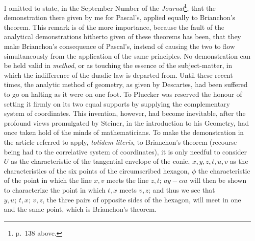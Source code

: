 \documentclass[11pt]{article}
\newcommand{\sourcepage}[1]{\marginpar{\scriptsize p.~#1}}
\begin{document}
\sourcepage{151}
I omitted to state, in the September Number of the \emph{Journal}\footnote{p.~138 above.}, that the demonstration there given by me for Pascal's, applied equally to Brianchon's theorem. This remark is of the more importance, because the fault of the analytical demonstrations hitherto given of these theorems has been, that they make Brianchon's consequence of Pascal's, instead of causing the two to flow simultaneously from the application of the same principles. No demonstration can be held valid in \emph{method}, or as touching the essence of the subject-matter, in which the indifference of the duadic law is departed from. Until these recent times, the analytic method of geometry, as given by Descartes, had been suffered to go on halting as it were on one foot. To Pluecker was reserved the honour of setting it firmly on its two equal supports by supplying the complementary system of coordinates. This invention, however, had become inevitable, after the profound views promulgated by Steiner, in the introduction to his Geometry, had once taken hold of the minds of mathematicians. To make the demonstration in the article referred to apply, \emph{totidem literis}, to Brianchon's theorem (recourse being had to the correlative system of coordinates), it is only needful to consider $U$ as the characteristic of the tangential envelope of the conic, $x,y,z,t,u,v$ as the characteristics of the six points of the circumscribed hexagon, $\phi$ the characteristic of the point in which the line $x,v$ meets the line $z,t$; $ay-\alpha u$ will then be shown to characterize the point in which $t,x$ meets $v,z$; and thus we see that $y,u;\ t,x;\ v,z$, the three pairs of opposite sides of the hexagon, will meet in one and the same point, which is Brianchon's theorem.
\end{document}
